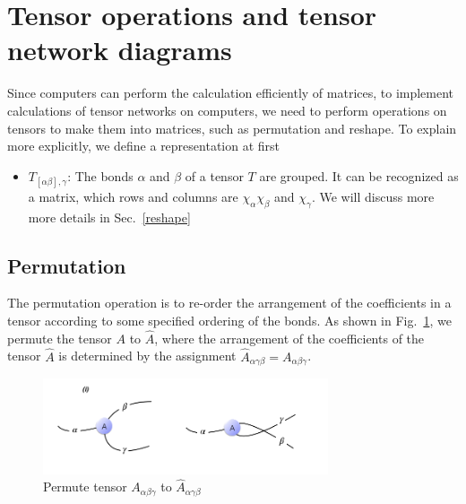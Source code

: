 \section{Tensor operations and tensor network diagrams} %
\label{operation}

Since computers can perform the calculation efficiently of matrices, to implement calculations of tensor networks on computers, we need to perform operations on tensors to make them into matrices, such as permutation and reshape. To explain more explicitly, we define a representation at first


\begin{itemize}
	\item $T_{[\alpha \beta], \gamma}$: The bonds $\alpha$ and $\beta$ of a tensor $T$ are grouped. It can be recognized as a matrix, which rows and columns are $\chi_{\alpha}\chi_{\beta}$ and $\chi_{\gamma}$. We will discuss more more details in Sec.~\ref{reshape}
\end{itemize}

\subsection{Permutation}

The permutation operation is to re-order the arrangement of the coefficients in a tensor according to some specified ordering of the bonds. As shown in Fig.~\ref{fig224}, we permute the tensor $A$ to $\hat{A}$, where the arrangement of the coefficients of the tensor $\hat{A}$ is determined by the assignment $\hat{A}_{\alpha \gamma \beta} = A_{\alpha \beta \gamma}$.

\begin{figure}[H]
	\centering
	\includegraphics[width=0.75\textwidth]{figures/fig224.png}
	\caption[The permutation of a tensor.]{ Permute tensor $A_{\alpha \beta \gamma}$ to $\hat{A}_{\alpha \gamma \beta}$ }
	\label{fig224}
\end{figure}

